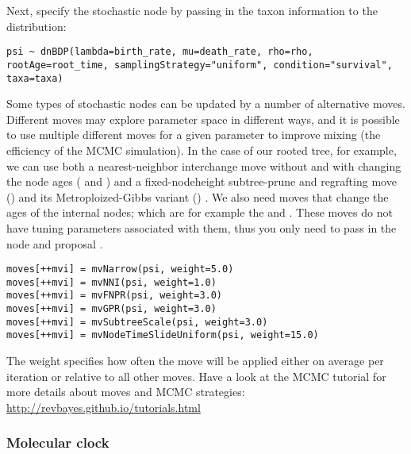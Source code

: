 Next, specify the  stochastic node by passing in the taxon information  to the  distribution:
{\tt \begin{snugshade*}
\begin{lstlisting}
psi ~ dnBDP(lambda=birth_rate, mu=death_rate, rho=rho, rootAge=root_time, samplingStrategy="uniform", condition="survival", taxa=taxa)
\end{lstlisting}
\end{snugshade*}}

Some types of stochastic nodes can be updated by a number of alternative moves. 
Different moves may explore parameter space in different ways, and it is possible to use multiple different moves for a given parameter to improve mixing (the efficiency of the MCMC simulation). 
In the case of our rooted tree, for example, we can use both a nearest-neighbor interchange move without and with changing the node ages ( and ) and a fixed-nodeheight subtree-prune and regrafting move () and its Metroploized-Gibbs variant () \citep{Hoehna2008,Hoehna2012}. 
We also need moves that change the ages of the internal nodes; which are for example the  and .
These moves do not have tuning parameters associated with them, thus you only need to pass in the  node and proposal . 
{\tt \begin{snugshade*}
\begin{lstlisting}
moves[++mvi] = mvNarrow(psi, weight=5.0)
moves[++mvi] = mvNNI(psi, weight=1.0)
moves[++mvi] = mvFNPR(psi, weight=3.0)
moves[++mvi] = mvGPR(psi, weight=3.0)
moves[++mvi] = mvSubtreeScale(psi, weight=3.0)
moves[++mvi] = mvNodeTimeSlideUniform(psi, weight=15.0)
\end{lstlisting}
\end{snugshade*}}
The weight specifies how often the move will be applied either on average per iteration or relative to all other moves.
Have a look at the MCMC tutorial for more details about moves and MCMC strategies: \href{http://revbayes.github.io/tutorials.html}{http://revbayes.github.io/tutorials.html}



\subsubsection{Molecular clock}

